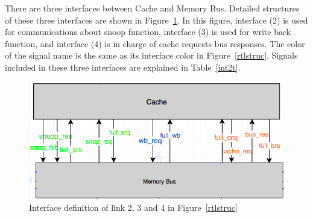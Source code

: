\documentclass[12pt,frontmatter,copyright,thesis]{usfmanus}
\begin{document}
There are three interfaces between Cache and Memory Bus. Detailed
structures of these three interfaces are shown in Figure~\ref{int2}.
In this figure, interface (2) is used for
communications about snoop function,
interface (3) is used for write back function, and
interface (4) is in charge of cache requests bus responses.
The color of the signal name is the same as its interface color in Figure~\ref{rtlstruc}.
 Signals included in these three interfaces are
explained in Table~\ref{int2t}.
\begin{figure}[h]
\centering
    \includegraphics[width=5in]{int2.png}
    \caption{Interface definition of link 2, 3 and 4 in Figure~\ref{rtlstruc}}
    \label{int2}
 \end{figure}
\end{document}
